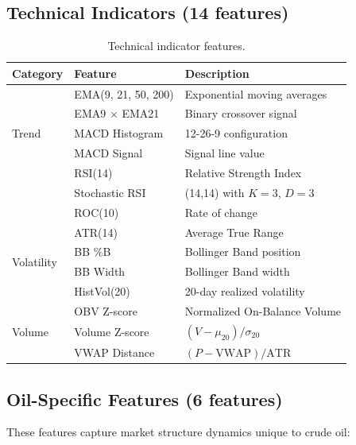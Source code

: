 \documentclass[12pt,a4paper]{article}
\begin{document}
\subsection{Technical Indicators (14 features)}

\begin{table}[h!]
\centering
\caption{Technical indicator features.}
\label{tab:technical_features}
\begin{tabular}{@{}lll@{}}
\toprule
\textbf{Category} & \textbf{Feature} & \textbf{Description} \\
\midrule
\multirow{5}{*}{Trend} & EMA(9, 21, 50, 200) & Exponential moving averages \\
 & EMA9 $\times$ EMA21 & Binary crossover signal \\
\midrule
\multirow{2}{*}{MACD} & MACD Histogram & 12-26-9 configuration \\
 & MACD Signal & Signal line value \\
\midrule
\multirow{3}{*}{Momentum} & RSI(14) & Relative Strength Index \\
 & Stochastic RSI & (14,14) with $K{=}3$, $D{=}3$ \\
 & ROC(10) & Rate of change \\
\midrule
\multirow{4}{*}{Volatility} & ATR(14) & Average True Range \\
 & BB \%B & Bollinger Band position \\
 & BB Width & Bollinger Band width \\
 & HistVol(20) & 20-day realized volatility \\
\midrule
\multirow{3}{*}{Volume} & OBV Z-score & Normalized On-Balance Volume \\
 & Volume Z-score & $(V - \mu_{20}) / \sigma_{20}$ \\
 & VWAP Distance & $(P - \text{VWAP}) / \text{ATR}$ \\
\bottomrule
\end{tabular}
\end{table}

\subsection{Oil-Specific Features (6 features)}
\label{sec:features:oil}

These features capture market structure dynamics unique to crude oil:
\end{document}
